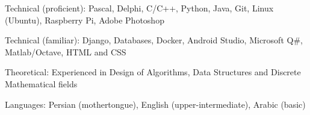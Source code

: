 

\begin{cvskills}

  \cvskill
    {Technical (proficient):}
    {Pascal, Delphi, C/C++, Python, Java, Git, Linux (Ubuntu), Raspberry Pi, Adobe Photoshop}

  \cvskill
    {Technical (familiar):}
    {Django, Databases, Docker, Android Studio, Microsoft Q\#, Matlab/Octave, HTML and CSS}

  \cvskill
    {Theoretical:}
    {Experienced in Design of Algorithms, Data Structures and Discrete Mathematical fields}

  \cvskill
    {Languages:}
    {Persian (mothertongue), English (upper-intermediate), Arabic (basic)} %

\end{cvskills}
